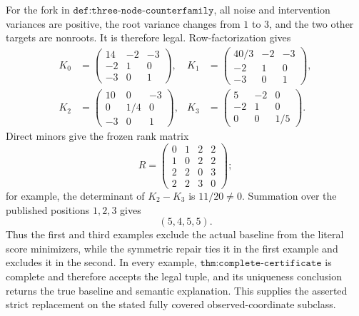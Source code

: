 For the fork in \(\texttt{def:three-node-counterfamily}\), all noise and
intervention variances are positive, the root variance changes from \(1\)
to \(3\), and the two other targets are nonroots.  It is therefore legal.
Row-factorization gives
\[
 \begin{aligned}
 K_0&=\begin{pmatrix}14&-2&-3\\-2&1&0\\-3&0&1\end{pmatrix},&
 K_1&=\begin{pmatrix}40/3&-2&-3\\-2&1&0\\-3&0&1\end{pmatrix},\\
 K_2&=\begin{pmatrix}10&0&-3\\0&1/4&0\\-3&0&1\end{pmatrix},&
 K_3&=\begin{pmatrix}5&-2&0\\-2&1&0\\0&0&1/5\end{pmatrix}.
 \end{aligned}
\]
Direct minors give the frozen rank matrix
\[
 R=\begin{pmatrix}
 0&1&2&2\\
 1&0&2&2\\
 2&2&0&3\\
 2&2&3&0
 \end{pmatrix};
\]
for example, the determinant of \(K_2-K_3\) is \(11/20\neq0\).
Summation over the published positions \(1,2,3\) gives
\[
 (5,4,5,5).
\]
Thus the first and third examples exclude the actual baseline from the
literal score minimizers, while the symmetric repair ties it in the first
example and excludes it in the second.  In every example,
\(\texttt{thm:complete-certificate}\) is complete and therefore accepts
the legal tuple, and its uniqueness conclusion returns the true baseline
and semantic explanation.  This supplies the asserted strict replacement
on the stated fully covered observed-coordinate subclass.

